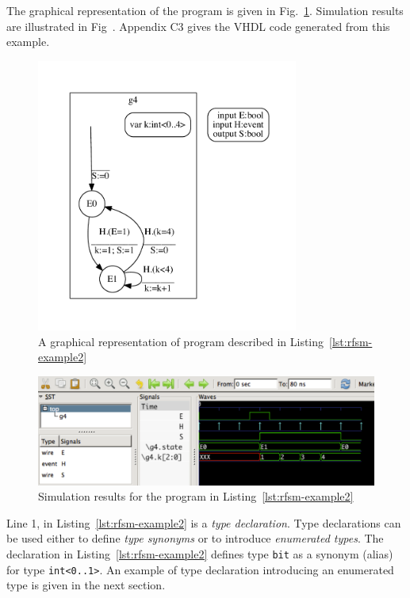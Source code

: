 \medskip
The graphical representation of the program is given in Fig.~\ref{fig:rfsm-example2-top}. Simulation
results are illustrated in Fig~\pageref{fig:rfsm-example2-vcd}. 
Appendix C3 gives the VHDL code generated from this example.

\begin{figure}[h]
   \includegraphics[height=9cm]{figs/gensig-top}
   \centering
  \caption{A graphical representation of program described in Listing~\ref{lst:rfsm-example2}}
  \label{fig:rfsm-example2-top}
\end{figure}

\begin{figure}[h]
   \includegraphics[width=\textwidth]{figs/gensig-chrono}
   \centering
  \caption{Simulation results for the program in Listing~\ref{lst:rfsm-example2}}
  \label{fig:rfsm-example2-vcd}
\end{figure}

\medskip
Line 1, in Listing~\ref{lst:rfsm-example2} is a \emph{type declaration}. Type declarations can be
used either to define \emph{type synonyms} or to introduce \emph{enumerated types}.
The declaration in Listing~\ref{lst:rfsm-example2} defines type \verb|bit| as a synonym (alias) for
type \verb|int<0..1>|. An example of type declaration introducing an enumerated type is given in the
next section.

